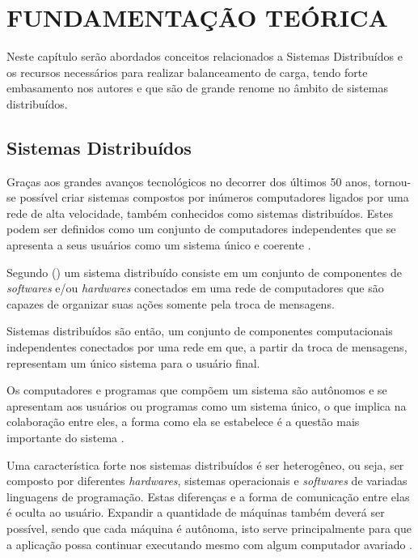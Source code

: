 \chapter{FUNDAMENTAÇÃO TEÓRICA}

Neste capítulo serão abordados conceitos relacionados a Sistemas Distribuídos e os recursos necessários para realizar balanceamento de carga, tendo forte embasamento nos autores  e  que são de grande renome no âmbito de sistemas distribuídos.

\section{Sistemas Distribuídos}

	Graças aos grandes avanços tecnológicos no decorrer dos últimos 50 anos, tornou-se possível criar sistemas compostos por inúmeros computadores ligados por uma rede de alta velocidade, também conhecidos como sistemas distribuídos. Estes podem ser definidos como um conjunto de computadores independentes que se apresenta a seus usuários como um sistema único e coerente \cite{Tanenbaum}.
	
	Segundo  (\citeyear{Coulouris-2012}) um sistema distribuído consiste em um conjunto de componentes de \textit{softwares} e/ou \textit{hardwares} conectados em uma rede de computadores que são capazes de organizar suas ações somente pela troca de mensagens.
	
	Sistemas distribuídos são então, um conjunto de componentes computacionais independentes conectados por uma rede em que, a partir da troca de mensagens, representam um único sistema para o usuário final.
	
	Os computadores e programas que compõem um sistema são autônomos e se apresentam aos usuários ou programas como um sistema único, o que implica na colaboração entre eles, a forma como ela se estabelece é a questão mais importante do sistema \cite{Tanenbaum}. 
	
	Uma característica forte nos sistemas distribuídos é ser heterogêneo, ou seja, ser composto por diferentes \textit{hardwares}, sistemas operacionais e \textit{softwares} de variadas linguagens de programação. Estas diferenças e a forma de comunicação entre elas é oculta ao usuário. Expandir a quantidade de máquinas também deverá ser possível, sendo que cada máquina é autônoma, isto serve principalmente para que a aplicação possa continuar executando mesmo com algum computador avariado \cite{Tanenbaum}.
	
